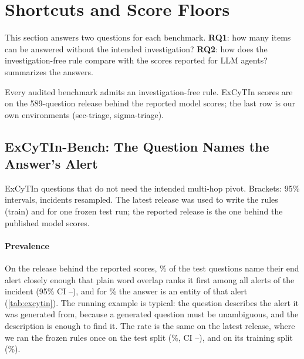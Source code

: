 \section{Shortcuts and Score Floors}
\label{sec:floors}

This section answers two questions for each benchmark. \textbf{RQ1}: how many items can be answered without the intended investigation? \textbf{RQ2}: how does the investigation-free rule compare with the scores reported for LLM agents?  summarizes the answers.

\begin{table}[t]
  \caption{Every audited benchmark admits an investigation-free rule. ExCyTIn scores are on the 589-question release behind the reported model scores; the last row is our own environments (sec-triage, sigma-triage).}
  \label{tab:benchmarks}
  \centering\footnotesize
  \begin{adjustbox}{max width=\columnwidth}\end{adjustbox}
\end{table}

\subsection{ExCyTIn-Bench: The Question Names the Answer's Alert}
\label{sec:excytin}

\begin{table}[t]
  \caption{ExCyTIn questions that do not need the intended multi-hop pivot. Brackets: 95\% intervals, incidents resampled. The latest release was used to write the rules (train) and for one frozen test run; the reported release is the one behind the published model scores.}
  \label{tab:excytin}
  \centering\footnotesize
  \begin{adjustbox}{max width=\columnwidth}\end{adjustbox}
\end{table}

\paragraph{Prevalence} On the release behind the reported scores, \oNamed\% of the \oN{} test questions name their end alert closely enough that plain word overlap ranks it first among all alerts of the incident (95\% CI \oNamedLo--\oNamedHi), and for \oAdj\% the answer is an entity of that alert (\cref{tab:excytin}). The running example is typical: the question describes the alert it was generated from, because a generated question must be unambiguous, and the description is enough to find it. The rate is the same on the latest release, where we ran the frozen rules once on the test split (\exNamed\%, CI \exNamedLo--\exNamedHi), and on its training split (\exTrainNamed\%).

